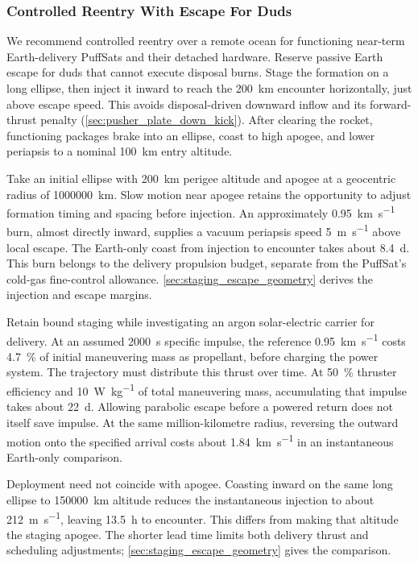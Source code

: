 \documentclass{article}
\begin{document}
\subsubsection{Controlled Reentry With Escape For Duds}\label{sec:near_term_disposal}
We recommend controlled reentry over a remote ocean for functioning near-term Earth-delivery PuffSats and their detached hardware. Reserve passive Earth escape for duds that cannot execute disposal burns. Stage the formation on a long ellipse, then inject it inward to reach the \SI{200}{\kilo\meter} encounter horizontally, just above escape speed. This avoids disposal-driven downward inflow and its forward-thrust penalty (\autoref{sec:pusher_plate_down_kick}). After clearing the rocket, functioning packages brake into an ellipse, coast to high apogee, and lower periapsis to a nominal \SI{100}{\kilo\meter} entry altitude.

Take an initial ellipse with \SI{200}{\kilo\meter} perigee altitude and apogee at a geocentric radius of \SI{1000000}{\kilo\meter}. Slow motion near apogee retains the opportunity to adjust formation timing and spacing before injection. An approximately \SI{0.95}{\kilo\meter\per\second} burn, almost directly inward, supplies a vacuum periapsis speed \SI{5}{\meter\per\second} above local escape. The Earth-only coast from injection to encounter takes about \SI{8.4}{\day}. This burn belongs to the delivery propulsion budget, separate from the PuffSat's cold-gas fine-control allowance. \autoref{sec:staging_escape_geometry} derives the injection and escape margins.

Retain bound staging while investigating an argon solar-electric carrier for delivery. At an assumed \SI{2000}{\second} specific impulse, the reference \SI{0.95}{\kilo\meter\per\second} costs \SI{4.7}{\percent} of initial maneuvering mass as propellant, before charging the power system. The trajectory must distribute this thrust over time. At \SI{50}{\percent} thruster efficiency and \SI{10}{\watt\per\kilogram} of total maneuvering mass, accumulating that impulse takes about \SI{22}{\day}. Allowing parabolic escape before a powered return does not itself save impulse. At the same million-kilometre radius, reversing the outward motion onto the specified arrival costs about \SI{1.84}{\kilo\meter\per\second} in an instantaneous Earth-only comparison.

Deployment need not coincide with apogee. Coasting inward on the same long ellipse to \SI{150000}{\kilo\meter} altitude reduces the instantaneous injection to about \SI{212}{\meter\per\second}, leaving \SI{13.5}{\hour} to encounter. This differs from making that altitude the staging apogee. The shorter lead time limits both delivery thrust and scheduling adjustments; \autoref{sec:staging_escape_geometry} gives the comparison.
\end{document}
